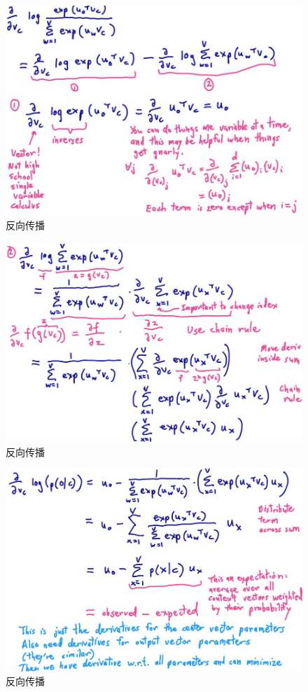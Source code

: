 	\begin{figure}[!htbp]
	\centering\includegraphics[width=6.5in]{img/6-6.png}
	\caption{反向传播}\label{fig:6-6}
	\end{figure}
	\begin{figure}[!htbp]
	\centering\includegraphics[width=6.5in]{img/6-7.png}
	\caption{反向传播}\label{fig:6-7}
	\end{figure}
	
	\begin{figure}[!htbp]
	\centering\includegraphics[width=6.5in]{img/6-8.png}
	\caption{反向传播}\label{fig:6-8}
	\end{figure}
	
